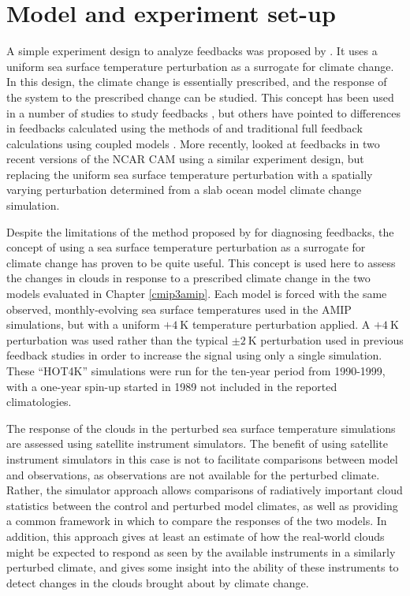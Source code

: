 \section{Model and experiment set-up}
A simple experiment design to analyze feedbacks was proposed by \cite{cess_and_potter_1988}. It uses a uniform sea surface temperature perturbation as a surrogate for climate change. In this design, the climate change is essentially prescribed, and the response of the system to the prescribed change can be studied. This concept has been used in a number of studies to study feedbacks \cite[e.g.,][]{cess_et_al_1990,cess_et_al_1996}, but others have pointed to differences in feedbacks calculated using the methods of \cite{cess_and_potter_1988} and traditional full feedback calculations using coupled models \citep{senior_and_mitchell_1993,soden_et_al_2004,ringer_et_al_2006}. More recently, \cite{gettelman_et_al_2011} looked at feedbacks in two recent versions of the NCAR CAM using a similar experiment design, but replacing the uniform sea surface temperature perturbation with a spatially varying perturbation determined from a slab ocean model climate change simulation.

Despite the limitations of the method proposed by \cite{cess_and_potter_1988} for diagnosing feedbacks, the concept of using a sea surface temperature perturbation as a surrogate for climate change has proven to be quite useful. This concept is used here to assess the changes in clouds in response to a prescribed climate change in the two models evaluated in Chapter \ref{cmip3amip}. Each model is forced with the same observed, monthly-evolving sea surface temperatures used in the AMIP simulations, but with a uniform $+4~\text{K}$ temperature perturbation applied. A $+4~\text{K}$ perturbation was used rather than the typical $\pm 2~\text{K}$ perturbation used in previous feedback studies in order to increase the signal using only a single simulation. These ``HOT4K'' simulations were run for the ten-year period from 1990-1999, with a one-year spin-up started in 1989 not included in the reported climatologies.

The response of the clouds in the perturbed sea surface temperature simulations are assessed using satellite instrument simulators. The benefit of using satellite instrument simulators in this case is not to facilitate comparisons between model and observations, as observations are not available for the perturbed climate. Rather, the simulator approach allows comparisons of radiatively important cloud statistics between the control and perturbed model climates, as well as providing a common framework in which to compare the responses of the two models. In addition, this approach gives at least an estimate of how the real-world clouds might be expected to respond as seen by the available instruments in a similarly perturbed climate, and gives some insight into the ability of these instruments to detect changes in the clouds brought about by climate change.

